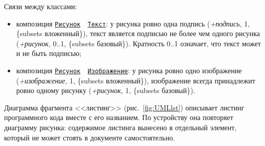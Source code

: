 Связи между классами:
\begin{itemize}
	\item композиция \hyperref[fig:UMLpic]{\Verb|Рисунок|}~~\hyperref[fig:UMLpic]{\Verb|Текст|}: у рисунка ровно одна подпись (\textit{+подпись}, 1, \{subsets вложенный\}), текст является подписью не более чем одного рисунка (\textit{+рисунок}, 0..1, \{subsets базовый\}). Кратность 0..1 означает, что текст может и не быть подписью;
	\item композиция \hyperref[fig:UMLpic]{\Verb|Рисунок|}~~\hyperref[fig:UMLpic]{\Verb|Изображение|}: у рисунка ровно одно изображение (\textit{+изображение}, 1, \{subsets вложенный\}), изображение всегда принадлежит ровно одному рисунку (\textit{+рисунок}, 1, \{subsets базовый\}).
\end{itemize}

Диаграмма фрагмента <<листинг>> (рис.~\ref{fig:UMLlst}) описывает листинг программного кода вместе с его названием. По устройству она повторяет диаграмму рисунка: содержимое листинга вынесено в отдельный элемент, который не может стоять в документе самостоятельно.

